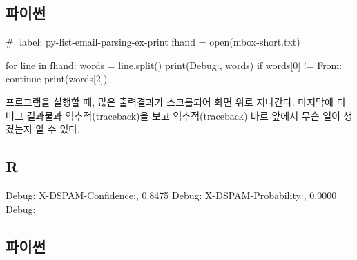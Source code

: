 \documentclass[
  letterpaper,
]{book}
\newenvironment{Shaded}{\begin{snugshade}}{\end{snugshade}}
\newcommand{\ExtensionTok}[1]{\textcolor[rgb]{0.00,0.23,0.31}{#1}}
\newcommand{\NormalTok}[1]{\textcolor[rgb]{0.00,0.23,0.31}{#1}}
\newcommand{\StringTok}[1]{\textcolor[rgb]{0.13,0.47,0.30}{#1}}
\begin{document}
\subsection{파이썬}

\begin{Shaded}
\begin{Highlighting}[]
\NormalTok{\#| label: py{-}list{-}email{-}parsing{-}ex{-}print}
\NormalTok{fhand = open(\textquotesingle{}mbox{-}short.txt\textquotesingle{})}

\NormalTok{for line in fhand:}
\NormalTok{    words = line.split()}
\NormalTok{    print(\textquotesingle{}Debug:\textquotesingle{}, words)}
\NormalTok{    if words[0] != \textquotesingle{}From\textquotesingle{}:}
\NormalTok{        continue}
\NormalTok{    print(words[2])}
\end{Highlighting}
\end{Shaded}

프로그램을 실행할 때, 많은 출력결과가 스크롤되어 화면 위로 지나간다.
마지막에 디버그 결과물과 역추적(traceback)을 보고 역추적(traceback) 바로
앞에서 무슨 일이 생겼는지 알 수 있다.

\subsection*{R}\label{r-80}

\begin{Shaded}
\begin{Highlighting}[]
\ExtensionTok{Debug:} \StringTok{\textquotesingle{}X{-}DSPAM{-}Confidence:\textquotesingle{}}\NormalTok{, }\StringTok{\textquotesingle{}0.8475\textquotesingle{}}
\ExtensionTok{Debug:} \StringTok{\textquotesingle{}X{-}DSPAM{-}Probability:\textquotesingle{}}\NormalTok{, }\StringTok{\textquotesingle{}0.0000\textquotesingle{}}
\ExtensionTok{Debug:} 
\end{Highlighting}
\end{Shaded}

\subsection*{파이썬}\label{uxd30cuxc774uxc36c-80}
\end{document}
